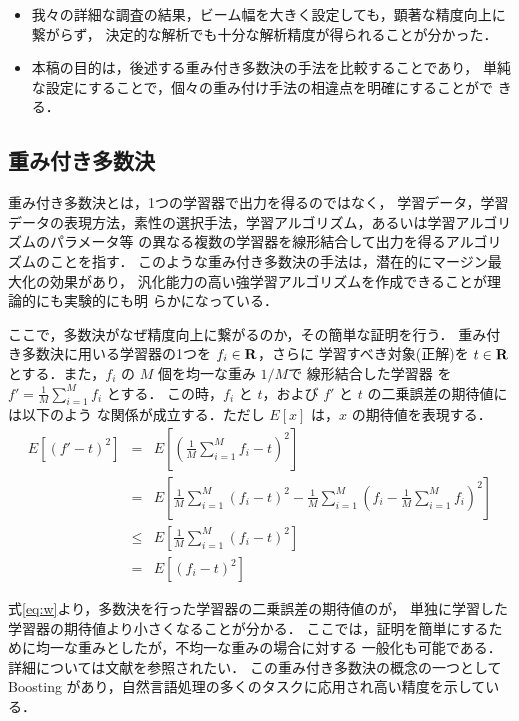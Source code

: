 \begin{itemize}
 \item 我々の詳細な調査の結果，ビーム幅を大きく設定しても，顕著な精度向上に繋がらず，
 決定的な解析でも十分な解析精度が得られることが分かった．
 \item 本稿の目的は，後述する重み付き多数決の手法を比較することであり，
 単純な設定にすることで，個々の重み付け手法の相違点を明確にすることがで
 きる．
\end{itemize}

\subsection{重み付き多数決}
重み付き多数決とは，1つの学習器で出力を得るのではなく，
学習データ，学習データの表現方法，素性の選択手法，学習アルゴリズム，あるいは学習アルゴリズムのパラメータ等
の異なる複数の学習器を線形結合して出力を得るアルゴリズムのことを指す．
このような重み付き多数決の手法は，潜在的にマージン最大化の効果があり，
汎化能力の高い強学習アルゴリズムを作成できることが理論的にも実験的にも明
らかになっている．

ここで，多数決がなぜ精度向上に繋がるのか，その簡単な証明を行う．
重み付き多数決に用いる学習器の1つを $f_i \in {\bf R}$，さらに
学習すべき対象(正解)を $t \in {\bf R}$ とする．また，$f_i$ の $M$ 個を均一な重み $1/M$で
線形結合した学習器 を $f' = \frac{1}{M}\sum_{i=1}^M f_i$ とする．
この時，$f_i$ と $t$，および $f'$ と $t$ の二乗誤差の期待値には以下のよう
な関係が成立する．ただし $E[x]$ は，$x$ の期待値を表現する．
\begin{eqnarray}
 E[(f' - t)^2] &=& E[\textstyle (\frac{1}{M}\textstyle \sum_{i=1}^M f_i - t)^2] \nonumber \\
               &=& E[\textstyle \frac{1}{M}\textstyle \sum_{i=1}^M (f_i -t)^2 - \frac{1}{M}\textstyle \sum_{i=1}^M (f_i -\frac{1}{M}\sum_{i=1}^M f_i)^2] \nonumber\\
               &\leq& E[\textstyle \frac{1}{M}\sum_{i=1}^M (f_i -t)^2] \nonumber\\
               &=&    E[(f_i -t)^2] \label{eq:w}
\end{eqnarray}

式\ref{eq:w}より，多数決を行った学習器の二乗誤差の期待値のが，
単独に学習した学習器の期待値より小さくなることが分かる．
ここでは，証明を簡単にするために均一な重みとしたが，不均一な重みの場合に対する
一般化も可能である．詳細については文献\cite{Haykin99}を参照されたい．
この重み付き多数決の概念の一つとして Boosting 
\cite{Freund96} があり，自然言語処理の多くのタスクに応用され高い精度を示している．


